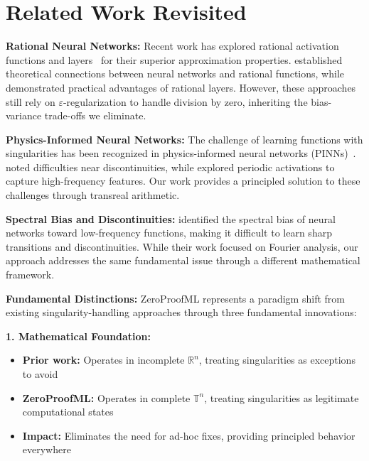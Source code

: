 \documentclass[twoside,11pt]{article}
\newcommand{\TR}{\mathbb{T}}
\begin{document}
\section{Related Work Revisited}

\textbf{Rational Neural Networks:}
Recent work has explored rational activation functions and layers~\citep{boulle2020rational,montanher2020pade,molina2020pade} for their superior approximation properties. \citet{telgarsky2017neural} established theoretical connections between neural networks and rational functions, while \citet{boulle2020rational} demonstrated practical advantages of rational layers. However, these approaches still rely on $\varepsilon$-regularization to handle division by zero, inheriting the bias-variance trade-offs we eliminate.

\textbf{Physics-Informed Neural Networks:}
The challenge of learning functions with singularities has been recognized in physics-informed neural networks (PINNs)~\citep{wang2021understanding,krishnapriyan2021characterizing}. \citet{jagtap2020conservative} noted difficulties near discontinuities, while \citet{sitzmann2020implicit} explored periodic activations to capture high-frequency features. Our work provides a principled solution to these challenges through transreal arithmetic.

\textbf{Spectral Bias and Discontinuities:}
\citet{rahaman2019spectral} identified the spectral bias of neural networks toward low-frequency functions, making it difficult to learn sharp transitions and discontinuities. While their work focused on Fourier analysis, our approach addresses the same fundamental issue through a different mathematical framework.

\textbf{Fundamental Distinctions:}
ZeroProofML represents a paradigm shift from existing singularity-handling approaches through three fundamental innovations:

\textbf{1. Mathematical Foundation:}
\begin{itemize}
\item \textbf{Prior work:} Operates in incomplete $\mathbb{R}^n$, treating singularities as exceptions to avoid
\item \textbf{ZeroProofML:} Operates in complete $\TR^n$, treating singularities as legitimate computational states
\item \textbf{Impact:} Eliminates the need for ad-hoc fixes, providing principled behavior everywhere
\end{itemize}
\end{document}
